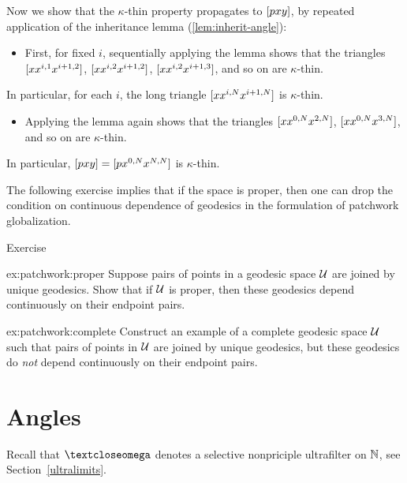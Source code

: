 Now we show that the $\kappa$-thin property propagates to $[{p}{x}{y}]$, by repeated application of the inheritance lemma (\ref{lem:inherit-angle}):
\begin{itemize}
\item 
First, for fixed $i$, 
sequentially applying the lemma shows  that the triangles 
$[{x}{x^{i,1}}{x^{i+1,2}}]$, 
$[{x}{x^{i,2}}{x^{i+1,2}}]$, 
$[{x}{x^{i,2}}{x^{i+1,3}}]$,
and so on are $\kappa$-thin. 
\end{itemize}
In particular, for each $i$, the long triangle $[{x}{x^{i,N}}{x^{i+1,N}}]$ is $\kappa$-thin.
\begin{itemize} 
\item 
Applying the lemma again shows that the  triangles $[{x}{x^{0,N}}{x^{2,N}}]$, $[{x}{x^{0,N}}{x^{3,N}}]$, and so on are $\kappa$-thin. 
\end{itemize}
In particular, $[{p}{x}{y}]=[{p}{x^{0,N}}{x^{N,N}}]$ is $\kappa$-thin.
\qeds

The following exercise implies that if the space is proper, then one can drop the condition on continuous dependence of geodesics in the formulation of patchwork globalization.

\begin{thm}{Exercise}\label{ex:patchwork}
\begin{subthm}{ex:patchwork:proper}
Suppose pairs of points in a geodesic space $\mathcal{U}$ are joined by unique geodesics.
Show that if $\mathcal{U}$ is proper, then 
these geodesics depend continuously on their endpoint pairs.
\end{subthm}

\begin{subthm}{ex:patchwork:complete}
Construct an example of a complete geodesic space $\mathcal{U}$ such that 
pairs of points in $\mathcal{U}$ are joined by unique geodesics, but
these geodesics do {}\emph{not} depend continuously on their endpoint pairs.
\end{subthm}
\end{thm}




\section{Angles}
\label{sec:angles-cba}

Recall that $\o$ denotes a selective nonpriciple ultrafilter on $\mathbb{N}$, see Section~\ref{ultralimits}. 

